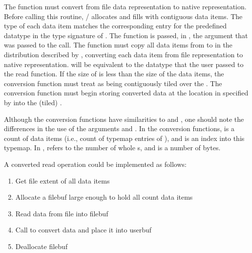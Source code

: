 The function 
must convert from
file data representation to native representation.
Before calling this routine,
\MPI/ allocates and fills  with  \linebreak
contiguous data items.
The type of each data item matches the
corresponding entry for the predefined datatype
in the type signature of .
The function is passed, in ,
the argument that was passed to the  call.
The function must copy all  data items from 
to  in the distribution described by ,
converting each data item
from file representation to native representation.
 will be equivalent to the datatype that the user
passed to the 
read
function.
If the size of  is less than the size
of the  data items, the conversion function must treat
 as being contiguously tiled over the .
The conversion function must
begin storing converted data at the location in 
specified by  into the (tiled) .

\begin{users}
Although the conversion functions have similarities
to  and 
,
one should note the differences in the use
of the arguments  and .
In the conversion functions,
 is a count of data items
(i.e., count of typemap entries of ),
and  is an index into this typemap.
In ,
 refers to the number of whole s,
and  is a number of bytes.
\end{users}

\begin{implementors}
A converted read operation could be implemented as follows:

\begin{enumerate}
\item Get file extent of all data items
\item Allocate a filebuf large enough to hold all count data items
\item Read data from file into filebuf
\item Call  to convert data and place it into userbuf
\item Deallocate filebuf
\end{enumerate}
\end{implementors}

